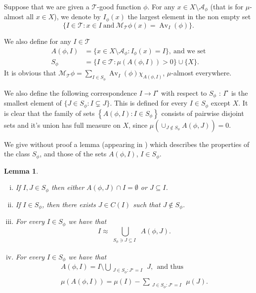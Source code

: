 \documentclass{article}
\numberwithin{equation}{section}
\newtheorem{lemma}{Lemma}[section]
\theoremstyle{definition}
\theoremstyle{remark}
\newcommand{\mc}[1]{\mathcal{#1}}
\DeclareMathOperator{\Av}{Av} %
\begin{document}
Suppose that we are given a $\mc T$-good function $\phi$. For any $x\in X\setminus\mc A_\phi$ (that is for $\mu$-almost all $x\in X$), we denote by $I_{\phi}(x)$ the largest element in the non empty set
\[
\big\{I\in \mc T: x\in I\ \text{and}\ \mc M_{\mc T}\phi(x) = \Av_I(\phi)\big\}.
\]

We also define for any $I\in \mc T$
\begin{align*}
A(\phi,I) &= \big\{ x\in X\setminus\mc A_\phi: I_\phi(x)=I \big\},\ \text{and we set} \\[2pt]
S_\phi &= \big\{ I\in\mc T: \mu\left(A(\phi,I)\right) > 0 \big\} \cup \big\{X\big\}.
\end{align*}
%
It is obvious that $\mc M_{\mc T}\phi = \sum_{I\in S_\phi} \Av_I(\phi) \chi_{A(\phi,I)}$, $\mu$-almost everywhere.

%
We also define the following correspondence $I \to I^\star$ with respect to $S_{\phi}$ : $I^\star$ is the smallest element of $\{ J\in S_\phi: I\subsetneq J \}$.
%
This is defined for every $I\in S_\phi$ except $X$. It is clear that the family of sets $\left\lbrace A(\phi,I): I\in S_{\phi}\right\rbrace$ consists of pairwise disjoint sets and it's union has full measure on $X$, since $\mu\!\left( \cup_{J\notin S_\phi} A(\phi,J) \right)=0$.

We give without proof a lemma (appearing in \cite{M}) which describes the properties of the class $S_{\phi}$, and those of the sets $A(\phi,I)$, $I\in S_{\phi}$.


\begin{lemma} \label{lem:3p1}
\begin{enumerate}[i)]
\item If $I, J\in S_\phi$ then either $A(\phi,J)\cap I = \emptyset$ or $J\subseteq I$.
\item If $I\in S_\phi$, then there exists $J\in C(I)$ such that $J\notin S_\phi$.
\item For every $I\in S_\phi$ we have that
\[
I \approx \underset{\substack{S_{\phi}\ni J \subseteq I\ \,}}{\bigcup} A(\phi,J).
\]
\item For every $I\in S_\phi$ we have that
\begin{gather*}
A(\phi,I) = I\setminus \underset{\substack{J\in S_\phi : J^\star = I\ }}{\bigcup} J,\ \ \text{and thus} \\
\mu(A(\phi,I)) = \mu(I) - \sum_{\substack{J\in S_\phi: J^\star=I\ }} \mu(J).
\end{gather*}
\end{enumerate}
\end{lemma}
\end{document}
